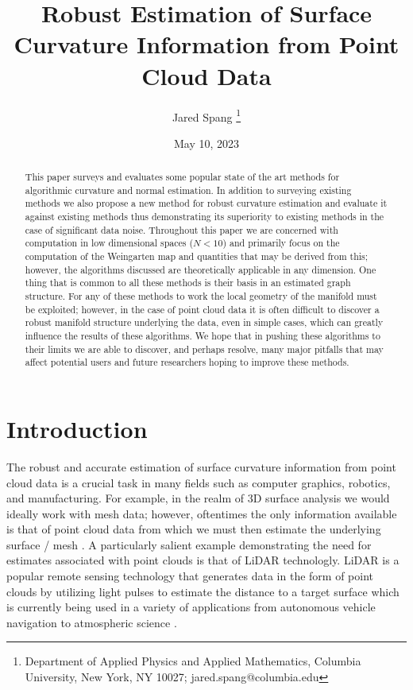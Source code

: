 \documentclass{article}
\title{Robust Estimation of Surface Curvature Information from Point Cloud Data}
\author{Jared Spang \thanks{{Department of Applied Physics and Applied Mathematics, Columbia University, New York, NY 10027; jared.spang@columbia.edu}}}
\date{\small May 10, 2023}
\begin{document}
\maketitle
\begin{abstract}
This paper surveys and evaluates some popular state of the art methods for algorithmic curvature and normal estimation. In addition to surveying existing methods we also propose a new method for robust curvature estimation and evaluate it against existing methods thus demonstrating its superiority to existing methods in the case of significant data noise. Throughout this paper we are concerned with computation in low dimensional spaces ($N < 10$) and primarily focus on the computation of the Weingarten map and quantities that may be derived from this; however, the algorithms discussed are theoretically applicable in any dimension. One thing that is common to all these methods is their basis in an estimated graph structure.  For any of these methods to work the local geometry of the manifold must be exploited; however, in the case of point cloud data it is often difficult to discover a robust manifold structure underlying the data, even in simple cases, which can greatly influence the results of these algorithms. We hope that in pushing these algorithms to their limits we are able to discover, and perhaps resolve, many major pitfalls that may affect potential users and future researchers hoping to improve these methods.  

\end{abstract}
\section{Introduction}

The robust and accurate estimation of surface curvature information from point cloud data is a crucial task in many fields such as computer graphics, robotics, and manufacturing. For example, in the realm of 3D surface analysis we would ideally work with mesh data; however, oftentimes the only information available is that of point cloud data from which we must then estimate the underlying surface / mesh \cite{DBLP:journals/corr/abs-2001-07884}. A particularly salient example demonstrating the need for estimates associated with point clouds is that of LiDAR technologly. LiDAR is a popular remote sensing technology that generates data in the form of point clouds by utilizing light pulses to estimate the distance to a target surface which is currently being used in a variety of applications from autonomous vehicle navigation to atmospheric science \cite{DBLP:journals/corr/abs-1910-13122, Koch2004C02}.
\end{document}

